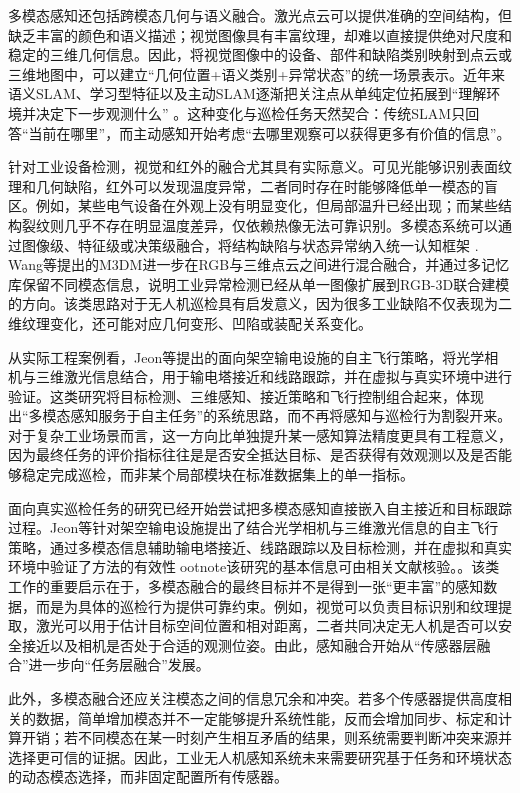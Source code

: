 多模态感知还包括跨模态几何与语义融合。激光点云可以提供准确的空间结构，但缺乏丰富的颜色和语义描述；视觉图像具有丰富纹理，却难以直接提供绝对尺度和稳定的三维几何信息。因此，将视觉图像中的设备、部件和缺陷类别映射到点云或三维地图中，可以建立“几何位置+语义类别+异常状态”的统一场景表示。近年来语义SLAM、学习型特征以及主动SLAM逐渐把关注点从单纯定位拓展到“理解环境并决定下一步观测什么”
\cite{huangzx2023survey,placed2023active}。这种变化与巡检任务天然契合：传统SLAM只回答“当前在哪里”，而主动感知开始考虑“去哪里观察可以获得更多有价值的信息”。

针对工业设备检测，视觉和红外的融合尤其具有实际意义。可见光能够识别表面纹理和几何缺陷，红外可以发现温度异常，二者同时存在时能够降低单一模态的盲区。例如，某些电气设备在外观上没有明显变化，但局部温升已经出现；而某些结构裂纹则几乎不存在明显温度差异，仅依赖热像无法可靠识别。多模态系统可以通过图像级、特征级或决策级融合，将结构缺陷与状态异常纳入统一认知框架
\cite{jadin2012recent,usamentiaga2014infrared}. Wang等提出的M3DM进一步在RGB与三维点云之间进行混合融合，并通过多记忆库保留不同模态信息，说明工业异常检测已经从单一图像扩展到RGB-3D联合建模的方向\cite{M3DM2023}。该类思路对于无人机巡检具有启发意义，因为很多工业缺陷不仅表现为二维纹理变化，还可能对应几何变形、凹陷或装配关系变化。

从实际工程案例看，Jeon等提出的面向架空输电设施的自主飞行策略，将光学相机与三维激光信息结合，用于输电塔接近和线路跟踪，并在虚拟与真实环境中进行验证。这类研究将目标检测、三维感知、接近策略和飞行控制组合起来，体现出“多模态感知服务于自主任务”的系统思路，而不再将感知与巡检行为割裂开来。对于复杂工业场景而言，这一方向比单独提升某一感知算法精度更具有工程意义，因为最终任务的评价指标往往是是否安全抵达目标、是否获得有效观测以及是否能够稳定完成巡检，而非某个局部模块在标准数据集上的单一指标。

面向真实巡检任务的研究已经开始尝试把多模态感知直接嵌入自主接近和目标跟踪过程。Jeon等针对架空输电设施提出了结合光学相机与三维激光信息的自主飞行策略，通过多模态信息辅助输电塔接近、线路跟踪以及目标检测，并在虚拟和真实环境中验证了方法的有效性ootnote{该研究的基本信息可由相关文献核验。}\cite{jeon2024multimodalinspection}。该类工作的重要启示在于，多模态融合的最终目标并不是得到一张“更丰富”的感知数据，而是为具体的巡检行为提供可靠约束。例如，视觉可以负责目标识别和纹理提取，激光可以用于估计目标空间位置和相对距离，二者共同决定无人机是否可以安全接近以及相机是否处于合适的观测位姿。由此，感知融合开始从“传感器层融合”进一步向“任务层融合”发展。

此外，多模态融合还应关注模态之间的信息冗余和冲突。若多个传感器提供高度相关的数据，简单增加模态并不一定能够提升系统性能，反而会增加同步、标定和计算开销；若不同模态在某一时刻产生相互矛盾的结果，则系统需要判断冲突来源并选择更可信的证据。因此，工业无人机感知系统未来需要研究基于任务和环境状态的动态模态选择，而非固定配置所有传感器。

